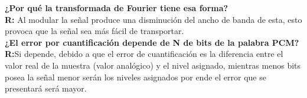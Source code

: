 \begin{enumerate}
    \textbf{¿Por qué la transformada de Fourier tiene esa forma?}\\
    \textbf{R:} Al modular la señal produce una disminución del ancho de banda de esta, esto provoca que la señal sea más fácil de transportar.\\
    
    \noindent 
    \textbf{¿El error por cuantificación depende de N  de bits de la palabra PCM?}\\
    \textbf{R:}Si depende, debido a que el error de cuantificación es la diferencia entre el valor real de la muestra (valor analógico) y el nivel asignado, mientras menos bits posea la señal menor serán los niveles asignados por ende el error que se presentará será mayor.
    
\end{enumerate}




